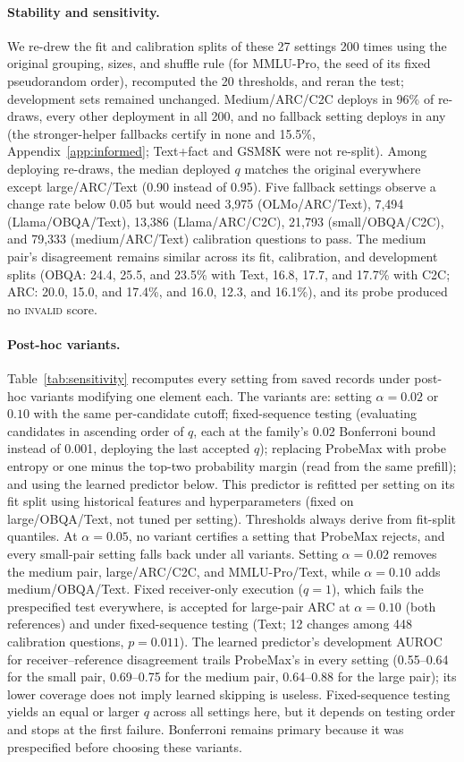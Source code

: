 \paragraph{Stability and sensitivity.} We re-drew the fit and calibration splits of these 27 settings 200 times using the original grouping, sizes, and shuffle rule (for MMLU-Pro, the seed of its fixed pseudorandom order), recomputed the 20 thresholds, and reran the test; development sets remained unchanged. Medium/ARC/C2C deploys in 96\% of re-draws, every other deployment in all 200, and no fallback setting deploys in any (the stronger-helper fallbacks certify in none and 15.5\%, Appendix~\ref{app:informed}; Text+fact and GSM8K were not re-split). Among deploying re-draws, the median deployed $q$ matches the original everywhere except large/ARC/Text (0.90 instead of 0.95). Five fallback settings observe a change rate below 0.05 but would need 3,975 (OLMo/ARC/Text), 7,494 (Llama/OBQA/Text), 13,386 (Llama/ARC/C2C), 21,793 (small/OBQA/C2C), and 79,333 (medium/ARC/Text) calibration questions to pass. The medium pair's disagreement remains similar across its fit, calibration, and development splits (OBQA: 24.4, 25.5, and 23.5\% with Text, 16.8, 17.7, and 17.7\% with C2C; ARC: 20.0, 15.0, and 17.4\%, and 16.0, 12.3, and 16.1\%), and its probe produced no \textsc{invalid} score.

\paragraph{Post-hoc variants.} Table~\ref{tab:sensitivity} recomputes every setting from saved records under post-hoc variants modifying one element each. The variants are: setting $\alpha=0.02$ or $0.10$ with the same per-candidate cutoff; fixed-sequence testing (evaluating candidates in ascending order of $q$, each at the family's 0.02 Bonferroni bound instead of 0.001, deploying the last accepted $q$); replacing ProbeMax with probe entropy or one minus the top-two probability margin (read from the same prefill); and using the learned predictor below. This predictor is refitted per setting on its fit split using historical features and hyperparameters (fixed on large/OBQA/Text, not tuned per setting). Thresholds always derive from fit-split quantiles. At $\alpha=0.05$, no variant certifies a setting that ProbeMax rejects, and every small-pair setting falls back under all variants. Setting $\alpha=0.02$ removes the medium pair, large/ARC/C2C, and MMLU-Pro/Text, while $\alpha=0.10$ adds medium/OBQA/Text. Fixed receiver-only execution ($q=1$), which fails the prespecified test everywhere, is accepted for large-pair ARC at $\alpha=0.10$ (both references) and under fixed-sequence testing (Text; 12 changes among 448 calibration questions, $p=0.011$). The learned predictor's development AUROC for receiver--reference disagreement trails ProbeMax's in every setting (0.55--0.64 for the small pair, 0.69--0.75 for the medium pair, 0.64--0.88 for the large pair); its lower coverage does not imply learned skipping is useless. Fixed-sequence testing yields an equal or larger $q$ across all settings here, but it depends on testing order and stops at the first failure. Bonferroni remains primary because it was prespecified before choosing these variants.

